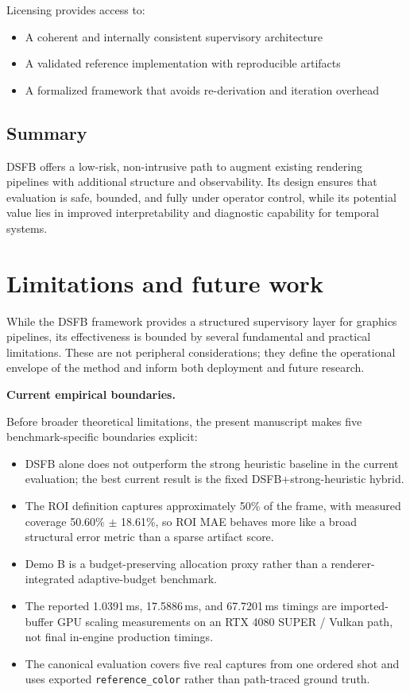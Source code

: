\documentclass[11pt,letterpaper]{article}
\theoremstyle{gcresult}
\theoremstyle{definition}
\begin{document}
Licensing provides access to:
\begin{itemize}
    \item A coherent and internally consistent supervisory architecture
    \item A validated reference implementation with reproducible artifacts
    \item A formalized framework that avoids re-derivation and iteration overhead
\end{itemize}

\subsection{Summary}
DSFB offers a low-risk, non-intrusive path to augment existing rendering pipelines with additional structure and observability. Its design ensures that evaluation is safe, bounded, and fully under operator control, while its potential value lies in improved interpretability and diagnostic capability for temporal systems.


\section{Limitations and future work}

While the DSFB framework provides a structured supervisory layer for graphics pipelines, its effectiveness is bounded by several fundamental and practical limitations. These are not peripheral considerations; they define the operational envelope of the method and inform both deployment and future research.

\vspace{0.5em}
\noindent
\textbf{Current empirical boundaries.}

Before broader theoretical limitations, the present manuscript makes five benchmark-specific boundaries explicit:
\begin{itemize}[leftmargin=1.5em]
    \item DSFB alone does not outperform the strong heuristic baseline in the current evaluation; the best current result is the fixed DSFB+strong-heuristic hybrid.
    \item The ROI definition captures approximately 50\% of the frame, with measured coverage 50.60\% $\pm$ 18.61\%, so ROI MAE behaves more like a broad structural error metric than a sparse artifact score.
    \item Demo B is a budget-preserving allocation proxy rather than a renderer-integrated adaptive-budget benchmark.
    \item The reported 1.0391\,ms, 17.5886\,ms, and 67.7201\,ms timings are imported-buffer GPU scaling measurements on an RTX 4080 SUPER / Vulkan path, not final in-engine production timings.
    \item The canonical evaluation covers five real captures from one ordered shot and uses exported \texttt{reference\_color} rather than path-traced ground truth.
\end{itemize}
\end{document}
